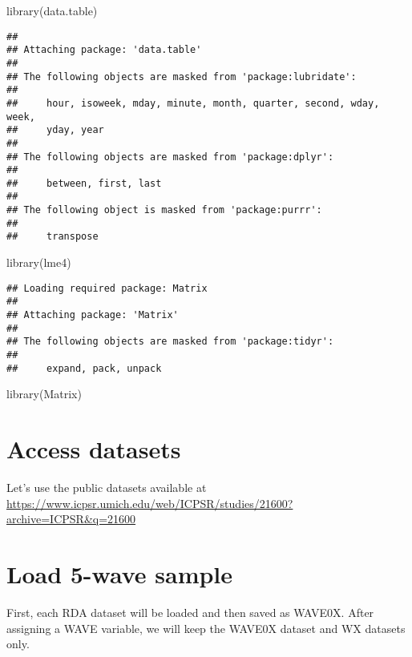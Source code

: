 \documentclass[
]{book}
\newenvironment{Shaded}{\begin{snugshade}}{\end{snugshade}}
\newcommand{\FunctionTok}[1]{\textcolor[rgb]{0.00,0.00,0.00}{#1}}
\newcommand{\NormalTok}[1]{#1}
\begin{document}
\begin{Shaded}
\begin{Highlighting}[]
\FunctionTok{library}\NormalTok{(data.table)}
\end{Highlighting}
\end{Shaded}

\begin{verbatim}
## 
## Attaching package: 'data.table'
## 
## The following objects are masked from 'package:lubridate':
## 
##     hour, isoweek, mday, minute, month, quarter, second, wday, week,
##     yday, year
## 
## The following objects are masked from 'package:dplyr':
## 
##     between, first, last
## 
## The following object is masked from 'package:purrr':
## 
##     transpose
\end{verbatim}

\begin{Shaded}
\begin{Highlighting}[]
\FunctionTok{library}\NormalTok{(lme4)}
\end{Highlighting}
\end{Shaded}

\begin{verbatim}
## Loading required package: Matrix
## 
## Attaching package: 'Matrix'
## 
## The following objects are masked from 'package:tidyr':
## 
##     expand, pack, unpack
\end{verbatim}

\begin{Shaded}
\begin{Highlighting}[]
\FunctionTok{library}\NormalTok{(Matrix)}
\end{Highlighting}
\end{Shaded}

\hypertarget{access-datasets}{%
\section{Access datasets}\label{access-datasets}}

Let's use the public datasets available at \url{https://www.icpsr.umich.edu/web/ICPSR/studies/21600?archive=ICPSR\&q=21600}

\hypertarget{load-5-wave-sample}{%
\section{Load 5-wave sample}\label{load-5-wave-sample}}

First, each RDA dataset will be loaded and then saved as WAVE0X. After assigning a WAVE variable, we will keep the WAVE0X dataset and WX datasets only.
\end{document}
